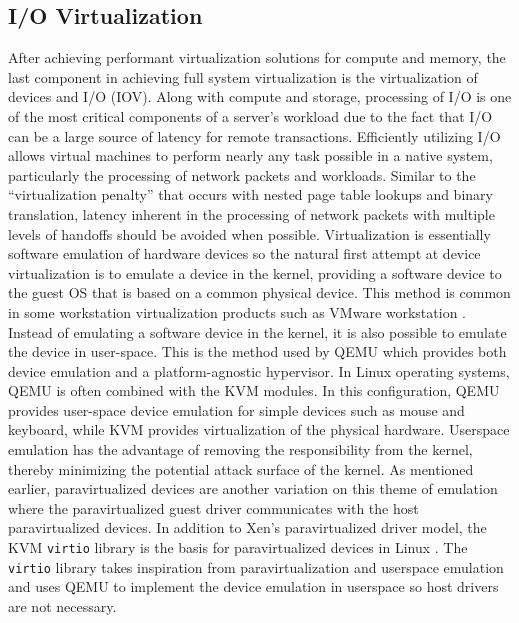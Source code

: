 \subsection{I/O Virtualization}
\label{sec:vt_io}
After achieving performant virtualization solutions for compute and memory, the last component in achieving full system virtualization is the virtualization of devices and I/O (IOV).
Along with compute and storage, processing of I/O is one of the most critical components of a server's workload due to the fact that I/O can be a large source of latency for remote transactions.
Efficiently utilizing I/O allows virtual machines to perform nearly any task possible in a native system, particularly the processing of network packets and workloads.
Similar to the ``virtualization penalty'' that occurs with nested page table lookups and binary translation, latency inherent in the processing of network packets with multiple levels of handoffs should be avoided when possible.
Virtualization is essentially software emulation of hardware devices so the natural first attempt at device virtualization is to emulate a device in the kernel, providing a software device to the guest OS that is based on a common physical device.
This method is common in some workstation virtualization products such as VMware workstation \autocite{_jones_1}.
Instead of emulating a software device in the kernel, it is also possible to emulate the device in user-space.
This is the method used by QEMU which provides both device emulation and a platform-agnostic hypervisor.
In Linux operating systems, QEMU is often combined with the KVM modules. 
In this configuration, QEMU provides user-space device emulation for simple devices such as mouse and keyboard, while KVM provides virtualization of the physical hardware.
Userspace emulation has the advantage of removing the responsibility from the kernel, thereby minimizing the potential attack surface of the kernel.
As mentioned earlier, paravirtualized devices are another variation on this theme of emulation where the paravirtualized guest driver communicates with the host paravirtualized devices.
In addition to Xen's paravirtualized driver model, the KVM \texttt{virtio} library is the basis for paravirtualized devices in Linux \autocite{_virtio_1}.
The \texttt{virtio} library takes inspiration from paravirtualization and userspace emulation and uses QEMU to implement the device emulation in userspace so host drivers are not necessary.


